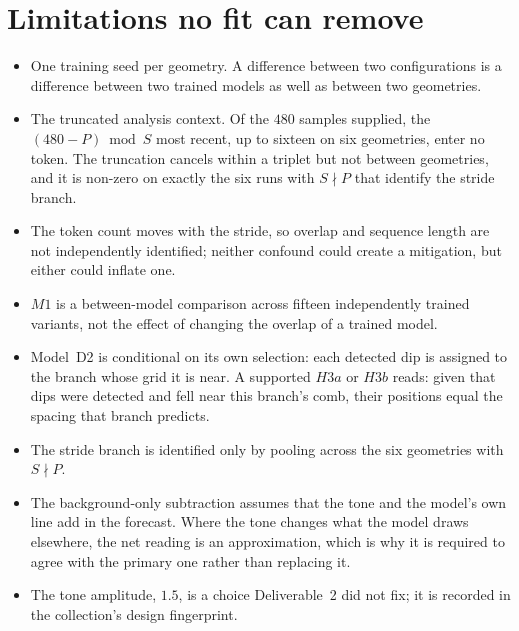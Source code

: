 \documentclass[10pt,a4paper]{article}
\begin{document}
\section{Limitations no fit can remove}
\begin{itemize}
\item One training seed per geometry. A difference between two configurations is a difference between two trained models as well as between two geometries.
\item The truncated analysis context. Of the $480$ samples supplied, the $(480-P)\bmod S$ most recent, up to sixteen on six geometries, enter no token. The truncation cancels within a triplet but not between geometries, and it is non-zero on exactly the six runs with $S\nmid P$ that identify the stride branch.
\item The token count moves with the stride, so overlap and sequence length are not independently identified; neither confound could create a mitigation, but either could inflate one.
\item $M1$ is a between-model comparison across fifteen independently trained variants, not the effect of changing the overlap of a trained model.
\item Model~D2 is conditional on its own selection: each detected dip is assigned to the branch whose grid it is near. A supported $H3a$ or $H3b$ reads: given that dips were detected and fell near this branch's comb, their positions equal the spacing that branch predicts.
\item The stride branch is identified only by pooling across the six geometries with $S\nmid P$.
\item The background-only subtraction assumes that the tone and the model's own line add in the forecast. Where the tone changes what the model draws elsewhere, the net reading is an approximation, which is why it is required to agree with the primary one rather than replacing it.
\item The tone amplitude, $1.5$, is a choice Deliverable~2 did not fix; it is recorded in the collection's design fingerprint.
\end{itemize}
\end{document}
